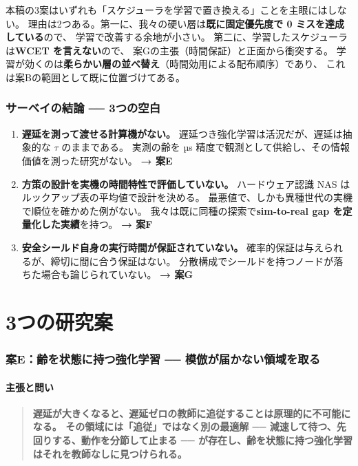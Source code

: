 \documentclass[11pt,a4paper]{article}
\newcommand{\prob}[1]{\textbf{\textcolor{red!55!black}{#1}}}
\newcommand{\keyp}[1]{\textbf{\textcolor{blue!45!black}{#1}}}
\begin{document}
\noindent
本稿の3案はいずれも「スケジューラを学習で置き換える」ことを主眼にはしない。
理由は2つある。第一に、我々の硬い層は\keyp{既に固定優先度で 0 ミスを達成している}ので、
学習で改善する余地が小さい。
第二に、学習したスケジューラは\prob{WCET を言えない}ので、
案Gの主張（時間保証）と正面から衝突する。
学習が効くのは\keyp{柔らかい層の並べ替え}（時間効用による配布順序）であり、
これは案Bの範囲として既に位置づけてある。

\section{サーベイの結論 ── 3つの空白}
\label{sec:gaps}

\begin{enumerate}[leftmargin=1.8em,itemsep=5pt]
  \item \prob{遅延を測って渡せる計算機がない。}
        遅延つき強化学習は活況だが、遅延は抽象的な $\tau$ のままである。
        実測の齢を µs 精度で観測として供給し、その情報価値を測った研究がない。
        \keyp{→ 案E}
  \item \prob{方策の設計を実機の時間特性で評価していない。}
        ハードウェア認識 NAS はルックアップ表の平均値で設計を決める。
        最悪値で、しかも異種世代の実機で順位を確かめた例がない。
        我々は既に同種の探索で\keyp{sim-to-real gap を定量化した実績}を持つ。
        \keyp{→ 案F}
  \item \prob{安全シールド自身の実行時間が保証されていない。}
        確率的保証は与えられるが、締切に間に合う保証はない。
        分散構成でシールドを持つノードが落ちた場合も論じられていない。
        \keyp{→ 案G}
\end{enumerate}

\clearpage
\part{3つの研究案}
\label{part:plans}

\section{案E：齢を状態に持つ強化学習 ── 模倣が届かない領域を取る}
\label{sec:planE}

\subsection{主張と問い}

\begin{quote}
\keyp{遅延が大きくなると、遅延ゼロの教師に追従することは原理的に不可能になる。
その領域には「追従」ではなく別の最適解 ── 減速して待つ、先回りする、動作を分節して止まる ──
が存在し、齢を状態に持つ強化学習はそれを教師なしに見つけられる。}
\end{quote}
\end{document}
